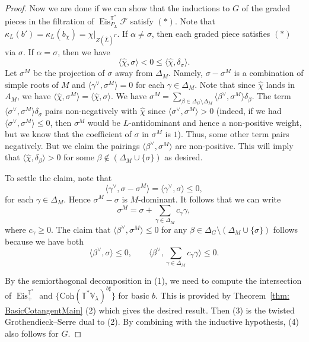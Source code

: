 \documentclass{amsart}
\theoremstyle{definition}
\theoremstyle{remark}
\numberwithin{equation}{section}
\newcommand{\mc}{\mathcal}
\newcommand{\wh}{\widehat}
\DeclareMathOperator{\Eis}{\mathrm{Eis}}
\newcommand{\Coh}{\mathrm{Coh}}
\newcommand{\V}{\mathbb{V}}
\newcommand{\T}{\mathbb{T}}
\begin{document}
\begin{proof}
Now we are done if we can show that the inductions to $G$ of the graded pieces in the filtration of $\Eis^{\T^{\ast}}_{P_L} \mc{F}$ satisfy $(\bm{\ast})$. Note that $\kappa_L(b') = \kappa_L(b_{\chi})=\chi|_{Z(\wh{L})^{\Gamma}}$. If $\alpha  \neq \sigma$, then each graded piece satisfies $(\bm{\ast})$ via $\sigma$. If $\alpha = \sigma$, then we have 
\begin{equation*}
    \langle \wh{\chi} , \sigma \rangle < 0 \leq \langle \wh{\chi}, \delta_{\sigma} \rangle.
\end{equation*}
Let $\sigma^M$ be the projection of $\sigma$ away from $\Delta_M$. Namely, $\sigma - \sigma^M$ is a combination of simple roots of $M$ and $\langle \gamma^\vee, \sigma^M \rangle = 0$ for each $\gamma \in \Delta_M$. Note that since $\wh{\chi}$ lands in $A_M$, we have $\langle \wh{\chi}, \sigma^M \rangle = \langle \wh{\chi}, \sigma\rangle$. We have $\sigma^M = \sum\limits_{\beta \in \Delta_G \setminus \Delta_M} \langle \beta^{\vee}, \sigma^M \rangle \delta_{\beta}$. The term $\langle \sigma^{\vee}, \sigma^M \rangle \delta_{\sigma}$ pairs non-negatively with $\wh{\chi}$ since $\langle \sigma^{\vee}, \sigma^M \rangle > 0$ (indeed, if we had $\langle \sigma^{\vee}, \sigma^M\rangle  \leq 0$, then $\sigma^M$ would be $L$-antidominant and hence a non-positive weight, but we know that the coefficient of $\sigma$ in $\sigma^M$ is $1$). 
Thus, some other term pairs negatively. But we claim the pairings $\langle \beta^{\vee}, \sigma^M \rangle$ are non-positive. This will imply that $\langle \wh{\chi}, \delta_{\beta}\rangle > 0$ for some $\beta \not\in (\Delta_M \cup \{\sigma\})$ as desired. 

To settle the claim, note that
\begin{equation*}
    \langle \gamma^{\vee}, \sigma - \sigma^M \rangle = \langle \gamma^{\vee}, \sigma \rangle \leq 0,
\end{equation*}
for each $\gamma \in \Delta_M$. Hence $\sigma^M - \sigma$ is $M$-dominant. It follows that we can write 
\begin{equation*}
    \sigma^M = \sigma + \sum\limits_{\gamma \in \Delta_M} c_{\gamma}\gamma,
\end{equation*}
where $c_{\gamma} \geq 0$. The claim that  $\langle \beta^{\vee}, \sigma^M \rangle \leq 0$ for any $\beta \in \Delta_G \setminus (\Delta_M \cup \{\sigma\})$ follows because we have both
\begin{equation*}
    \langle \beta^{\vee}, \sigma\rangle \leq 0, \qquad \langle \beta^{\vee}, \sum\limits_{\gamma \in \Delta_M} c_{\gamma}\gamma \rangle \leq 0.
\end{equation*}

By the semiorthogonal decomposition in (1), we need to compute the intersection of $\Eis^{\T^{\ast}}_+$ and $\{\Coh(\T^*\V_\lambda)^{b\sharp}\}$ for basic $b$. This is provided by Theorem~\ref{thm: BasicCotangentMain} (2) which gives the desired result. Then (3) is the twisted Grothendieck--Serre dual to (2). By combining with the inductive hypothesis, (4) also follows for $G$.  
\end{proof}
\end{document}
